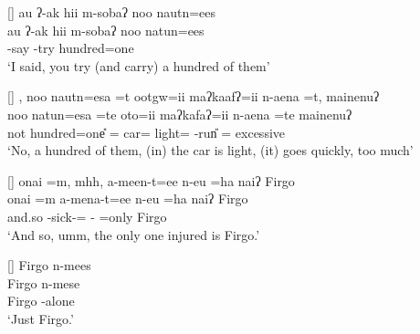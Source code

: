 \begin{exe}

[]{\glll
	au ʔ-ak hii m-sobaʔ noo nautn=ees \\
	au ʔ-ak hii m-sobaʔ noo natun=ees \\
	{\au} \q-say {\hii} \m-try {\manaq} hundred=one \\
\glt `I said, you try (and carry) a hundred of them'}

[]{\glll
	, noo nautn=esa =t ootgw=ii maʔkaafʔ=ii \hspace{20mm} n-aena =t, mainenuʔ \\
	 noo natun=esa =te oto=ii maʔkafaʔ=ii {} n-aena =te mainenuʔ \\
	not {\manaq} hundred=one{\U} ={\te} car={\ii} light={\ii} {} \n-run{\U} ={\te} excessive \\
\glt `No, a hundred of them, (in) the car is light, (it) goes quickly, too much'}

\newpage
{}
[]{\glll
	{onai =m}, mhh, a-meen-t=ee n-eu =ha naiʔ Firgo\\
	{onai =m} {} a-mena-t=ee n-eu =ha naiʔ Firgo \\
	and.so {} {\at}-sick-{\at}={\ee} \n-{\eu} =only {\naiq} Firgo \\
\glt `And so, umm, the only one injured is Firgo.'}

\vspace{-4pt}
[]{\glll
	Firgo n-mees \\
	Firgo n-mese \\
	Firgo \n-alone \\
\glt `Just Firgo.'}

\end{exe}
